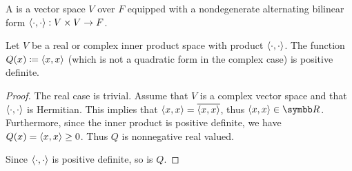 \begin{definition}\label{def:symplectic_vector_space}
  A  is a vector space \( V \) over \( F \) equipped with a nondegenerate  alternating bilinear form \( \left\langle \cdot, \cdot \right\rangle: V \times V \to F \).
\end{definition}

\begin{lemma}\label{thm:inner_product_quadratic_form_is_positive_definite}
  Let \( V \) be a real or complex inner product space with product \( \left\langle \cdot, \cdot \right\rangle \). The function \( Q(x) \coloneqq \left\langle x, x \right\rangle \) (which is not a quadratic form in the complex case) is positive definite.
\end{lemma}
\begin{proof}
  The real case is trivial. Assume that \( V \) is a complex vector space and that \( \left\langle \cdot, \cdot \right\rangle \) is Hermitian. This implies that \( \left\langle x, x \right\rangle = \overline{\left\langle x, x \right\rangle} \), thus \( \Prod x x \in \R \). Furthermore, since the inner product is positive definite, we have \( Q(x) = \left\langle x, x \right\rangle \geq 0 \). Thus \( Q \) is nonnegative real valued.

  Since \( \left\langle \cdot, \cdot \right\rangle \) is positive definite, so is \( Q \).
\end{proof}

